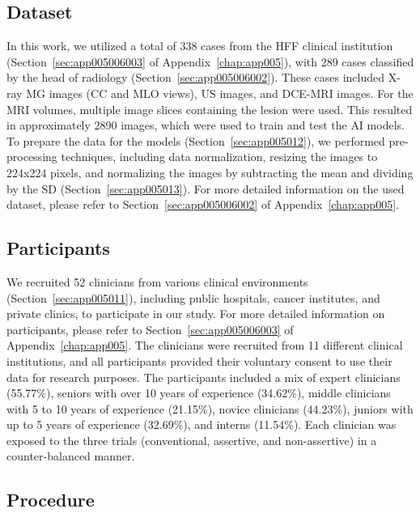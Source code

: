 \subsection{Dataset}
\label{sec:chap006005002}

In this work, we utilized a total of 338 cases from the \acs{HFF} clinical institution (Section~\ref{sec:app005006003} of Appendix~\ref{chap:app005}), with 289 cases classified by the head of radiology (Section~\ref{sec:app005006002}).
These cases included X-ray \acs{MG} images (\acs{CC} and \acs{MLO} views), \acs{US} images, and \acs{DCE-MRI} images.
For the \acs{MRI} volumes, multiple image slices containing the lesion were used.
This resulted in approximately 2890 images, which were used to train and test the \ac{AI} models.
To prepare the data for the models (Section~\ref{sec:app005012}), we performed pre-processing techniques, including data normalization, resizing the images to 224x224 pixels, and normalizing the images by subtracting the mean and dividing by the \acs{SD} (Section~\ref{sec:app005013}).
For more detailed information on the used dataset, please refer to Section~\ref{sec:app005006002} of Appendix~\ref{chap:app005}.

\subsection{Participants}
\label{sec:chap006005003}

We recruited 52 clinicians from various clinical environments (Section~\ref{sec:app005011}), including public hospitals, cancer institutes, and private clinics, to participate in our study.
For more detailed information on participants, please refer to Section~\ref{sec:app005006003} of Appendix~\ref{chap:app005}.
The clinicians were recruited from 11 different clinical institutions, and all participants provided their voluntary consent to use their data for research purposes.
The participants included a mix of expert clinicians (55.77\%), seniors with over 10 years of experience (34.62\%), middle clinicians with 5 to 10 years of experience (21.15\%), novice clinicians (44.23\%), juniors with up to 5 years of experience (32.69\%), and interns (11.54\%).
Each clinician was exposed to the three trials (conventional, assertive, and non-assertive) in a counter-balanced manner.

\subsection{Procedure}
\label{sec:chap006005004}

